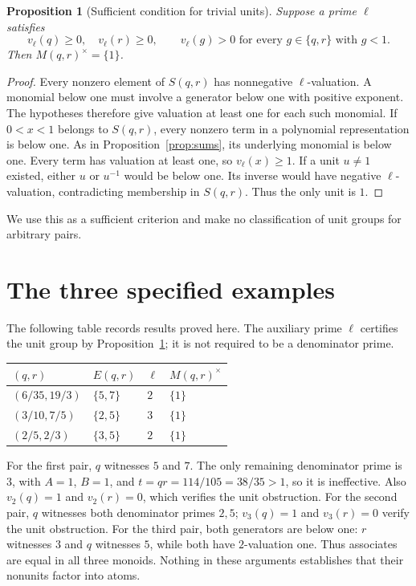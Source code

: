 \documentclass[11pt]{article}
\newtheorem{proposition}[theorem]{Proposition}
\theoremstyle{definition}
\begin{document}
\begin{proposition}[Sufficient condition for trivial units]\label{prop:units}
Suppose a prime $\ell$ satisfies
\[
 v_\ell(q)\ge0,\quad v_\ell(r)\ge0,\qquad
 v_\ell(g)>0\text{ for every }g\in\{q,r\}\text{ with }g<1.
\]
Then $M(q,r)^\times=\{1\}$.
\end{proposition}
\begin{proof}
Every nonzero element of $S(q,r)$ has nonnegative $\ell$-valuation.
A monomial below one must involve a generator below one with positive
exponent. The hypotheses therefore give valuation at least one for
each such monomial. If $0<x<1$ belongs to $S(q,r)$, every nonzero term
in a polynomial representation is below one. As in
Proposition~\ref{prop:sums}, its underlying monomial is below one.
Every term has valuation at least one, so $v_\ell(x)\ge1$.
If a unit $u\ne1$ existed, either $u$ or $u^{-1}$ would be below one.
Its inverse would have negative $\ell$-valuation, contradicting membership
in $S(q,r)$. Thus the only unit is $1$.
\end{proof}

We use this as a sufficient criterion and make no classification of unit
groups for arbitrary pairs.

\section{The three specified examples}
The following table records results proved here. The auxiliary prime
$\ell$ certifies the unit group by Proposition~\ref{prop:units}; it is
not required to be a denominator prime.
\begin{center}
\begin{tabular}{@{}llll@{}}
\toprule
$(q,r)$ & $E(q,r)$ & $\ell$ & $M(q,r)^\times$\\
\midrule
$(6/35,19/3)$ & $\{5,7\}$ & $2$ & $\{1\}$\\
$(3/10,7/5)$ & $\{2,5\}$ & $3$ & $\{1\}$\\
$(2/5,2/3)$ & $\{3,5\}$ & $2$ & $\{1\}$\\
\bottomrule
\end{tabular}
\end{center}

For the first pair, $q$ witnesses $5$ and $7$. The only remaining
denominator prime is $3$, with $A=1$, $B=1$, and
$t=qr=114/105=38/35>1$, so it is ineffective. Also
$v_2(q)=1$ and $v_2(r)=0$, which verifies the unit obstruction.
For the second pair, $q$ witnesses both denominator primes $2,5$;
$v_3(q)=1$ and $v_3(r)=0$ verify the unit obstruction.
For the third pair, both generators are below one: $r$ witnesses $3$
and $q$ witnesses $5$, while both have $2$-valuation one.
Thus associates are equal in all three monoids. Nothing in these arguments
establishes that their nonunits factor into atoms.
\end{document}
